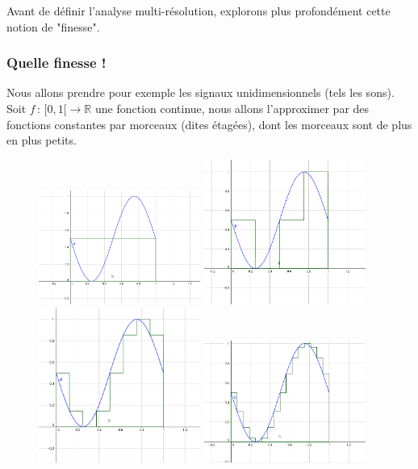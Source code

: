 \documentclass[]{article}
\theoremstyle{remark}
\theoremstyle{definition}
\newcommand{\funcshort}[3]{
	#1 \, : \, #2 \longrightarrow #3
}
\begin{document}
	Avant de définir l'analyse multi-résolution, explorons plus profondément cette notion de "finesse".
	
	\subsubsection*{Quelle finesse !}
	
	Nous allons prendre pour exemple les signaux unidimensionnels (tels les sons). Soit $\funcshort{f}{[0, 1[}{\mathbb{R}}$ une fonction continue, nous allons l'approximer par des fonctions constantes par morceaux (dites étagées), dont les morceaux sont de plus en plus petits.
	
	\begin{figure}[h]
		\label{sine-stairs}
		\centering
		\includegraphics[width=150pt]{sin_1.png}
		\includegraphics[width=150pt]{sin_2.png}
		\includegraphics[width=150pt]{sin_4.png}
		\includegraphics[width=150pt]{sin_8.png}

\end{figure}
\end{document}
